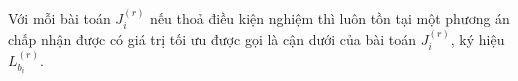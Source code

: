 \begin{dn}
	Với mỗi bài toán $J_i^{(r)}$ nếu thoả điều kiện nghiệm thì luôn tồn tại một phương án chấp nhận được có giá trị tối ưu được gọi là cận dưới của bài toán $J_i^{(r)}$, ký hiệu $L_{b_i}^{(r)}$.
\end{dn}




























